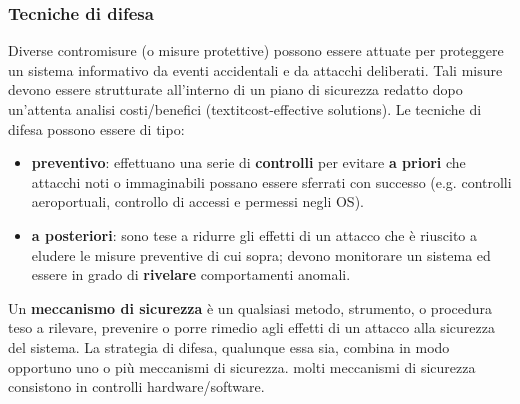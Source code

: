 \subsubsection{Tecniche di difesa}
Diverse contromisure (o misure protettive) possono essere attuate per proteggere un sistema informativo da eventi accidentali e da
attacchi deliberati. Tali misure devono essere strutturate all’interno di un piano di sicurezza redatto dopo un’attenta analisi costi/benefici (textit{cost-effective solutions}).
Le tecniche di difesa possono essere di tipo:
\begin{itemize} 
  \item \textbf{preventivo}: effettuano una serie di \textbf{controlli} per evitare \textbf{a priori} che attacchi noti o immaginabili possano essere sferrati con successo (e.g. controlli aeroportuali, controllo di accessi e permessi negli OS).
  \item \textbf{a posteriori}: sono tese a ridurre gli effetti di un attacco che è riuscito a eludere le misure preventive di cui sopra; devono monitorare un sistema ed essere in grado di \textbf{rivelare} comportamenti anomali.
\end{itemize}

Un \textbf{meccanismo di sicurezza} è un qualsiasi metodo, strumento, o procedura teso a rilevare, prevenire o porre rimedio agli effetti di un attacco alla sicurezza del sistema. La strategia di difesa, qualunque essa sia, combina in modo opportuno
uno o più meccanismi di sicurezza. molti meccanismi di sicurezza consistono in controlli hardware/software.

